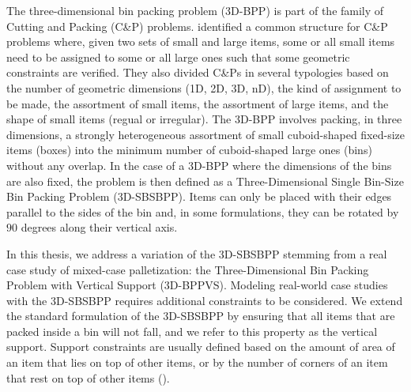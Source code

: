 The three-dimensional bin packing problem (3D-BPP) is part of the family of Cutting and Packing (C\&P) problems.
\cite{WASCHER20071109} identified a common structure for C\&P problems where, given two sets of small and large items, some or all small items need to be assigned to some or all large ones such that some geometric constraints are verified.
They also divided C\&Ps in several typologies based on the number of geometric dimensions (1D, 2D, 3D, nD), the kind of assignment to be made, the assortment of small items, the assortment of large items, and the shape of small items (regual or irregular).
The 3D-BPP involves packing, in three dimensions, a strongly heterogeneous assortment of small cuboid-shaped fixed-size items (boxes) into the minimum number of cuboid-shaped large ones (bins) without any overlap.
In the case of a 3D-BPP where the dimensions of the bins are also fixed, the problem is then defined as a Three-Dimensional Single Bin-Size Bin Packing Problem (3D-SBSBPP).
Items can only be placed with their edges parallel to the sides of the bin and, in some formulations, they can be rotated by $90$ degrees along their vertical axis.

In this thesis, we address a variation of the 3D-SBSBPP stemming from a real case study of mixed-case palletization: the Three-Dimensional Bin Packing Problem with Vertical Support (3D-BPPVS).
Modeling real-world case studies with the 3D-SBSBPP requires additional constraints to be considered. We extend the standard formulation of the 3D-SBSBPP by ensuring that all items that are packed inside a bin will not fall, and we refer to this property as the vertical support.
Support constraints are usually defined based on the amount of area of an item that lies on top of other items, or by the number of corners of an item that rest on top of other items (\cite{GZARA20201062, paquay2016mixed, kurpel2020exact}).

